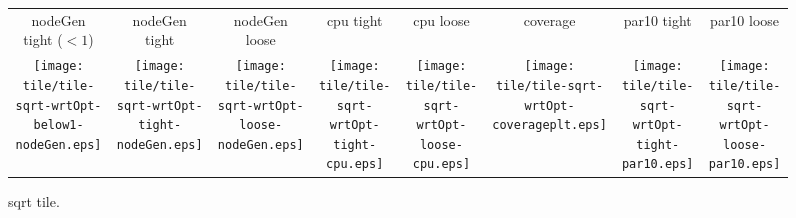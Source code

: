 \documentclass[a4paper,landscape]{article}
\begin{document}
\begin{figure}[t]
	\centering
	\begin{tabular}{c c c c c c c c}
        nodeGen tight ($<1$) & nodeGen tight & nodeGen loose & cpu
        tight & cpu loose & coverage & par10 tight & par10 loose\\
	   \begin{minipage}{\cpufigureplotwidth}
      \texttt{[image: tile/tile-sqrt-wrtOpt-below1-nodeGen.eps]}
        \end{minipage}&
        \begin{minipage}{\cpufigureplotwidth}
        \texttt{[image: tile/tile-sqrt-wrtOpt-tight-nodeGen.eps]}
        \end{minipage}&
        \begin{minipage}{\cpufigureplotwidth}
      \texttt{[image: tile/tile-sqrt-wrtOpt-loose-nodeGen.eps]}
        \end{minipage}&
        \begin{minipage}{\cpufigureplotwidth}
        \texttt{[image: tile/tile-sqrt-wrtOpt-tight-cpu.eps]}
        \end{minipage}&
        \begin{minipage}{\cpufigureplotwidth}
        \texttt{[image: tile/tile-sqrt-wrtOpt-loose-cpu.eps]}
        \end{minipage}&
        \begin{minipage}{\cpufigureplotwidth}
        \texttt{[image: tile/tile-sqrt-wrtOpt-coverageplt.eps]}
        \end{minipage}&
        \begin{minipage}{\cpufigureplotwidth}
        \texttt{[image: tile/tile-sqrt-wrtOpt-tight-par10.eps]}
        \end{minipage}&
        \begin{minipage}{\cpufigureplotwidth}
        \texttt{[image: tile/tile-sqrt-wrtOpt-loose-par10.eps]}
        \end{minipage}
	\end{tabular}
	\caption{sqrt tile.}
    \label{fig:tile-sqrt}
\end{figure}
\end{document}
